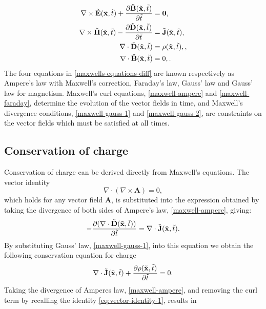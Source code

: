 \begin{subequations}
\label{maxwells-equations-diff}
\begin{align}
    \nabla \times \tilde{\mathbf{E}}(\tilde{\mathbf{x}},\tilde{t}) + \frac{\partial\tilde{\mathbf{B}}(\tilde{\mathbf{x}}, \tilde{t})}{\partial \tilde{t}}&= \mathbf{0}, \label{maxwell-faraday} \\
    \nabla \times \tilde{\mathbf{H}}(\tilde{\mathbf{x}},\tilde{t}) - \frac{\partial\tilde{\mathbf{D}}(\tilde{\mathbf{x}}, \tilde{t})}{\partial \tilde{t}}&= \tilde{\mathbf{J}}(\tilde{\mathbf{x}},\tilde{t}), \label{maxwell-ampere} \\
    \nabla \cdot \tilde{\mathbf{D}} (\tilde{\mathbf{x}},\tilde{t}) &= \rho(\tilde{\mathbf{x}},\tilde{t}), \label{maxwell-gauss-1}, \\
    \nabla \cdot \tilde{\mathbf{B}} (\tilde{\mathbf{x}},\tilde{t}) &= 0, \label{maxwell-gauss-2} .
\end{align}
\end{subequations}
The four equations in \eqref{maxwells-equations-diff} are known respectively as Ampere's law with Maxwell's correction, Faraday's law, Gauss' law and Gauss' law for magnetism. Maxwell's curl equations, \eqref{maxwell-ampere} and \eqref{maxwell-faraday}, determine the evolution of the vector fields in time, and Maxwell's divergence conditions, \eqref{maxwell-gauss-1} and \eqref{maxwell-gauss-2}, are constraints on the vector fields which must be satisfied at all times.

\subsection{Conservation of charge}

Conservation of charge can be derived directly from Maxwell's equations. The vector identity
\begin{equation}
\label{eq:vector-identity-1}
\nabla \cdot ( \nabla \times \mathbf{A} ) = 0,
\end{equation}
which holds for any vector field $\mathbf{A}$, is substituted into the expression obtained by taking the divergence of both sides of Ampere's law, \eqref{maxwell-ampere}, giving:
$$
- \frac{\partial( \nabla \cdot \tilde{\mathbf{D}}(\tilde{\mathbf{x}},\tilde{t}) ) }{\partial \tilde{t}} = \nabla \cdot \tilde{\mathbf{J}}(\tilde{\mathbf{x}},\tilde{t}) .
$$
By substituting Gauss' law, \eqref{maxwell-gauss-1}, into this equation we obtain the following conservation equation for charge
\begin{equation}
\label{eq:maxwell-charge-conservation-2}
\nabla \cdot \tilde{\mathbf{J}}(\tilde{\mathbf{x}},\tilde{t}) + \frac{\partial\rho (\tilde{\mathbf{x}},\tilde{t}) }{\partial \tilde{t}} = 0 .
\end{equation}
Taking the divergence of Amperes law, \eqref{maxwell-ampere}, and removing the curl term by recalling the identity \eqref{eq:vector-identity-1}, results in

